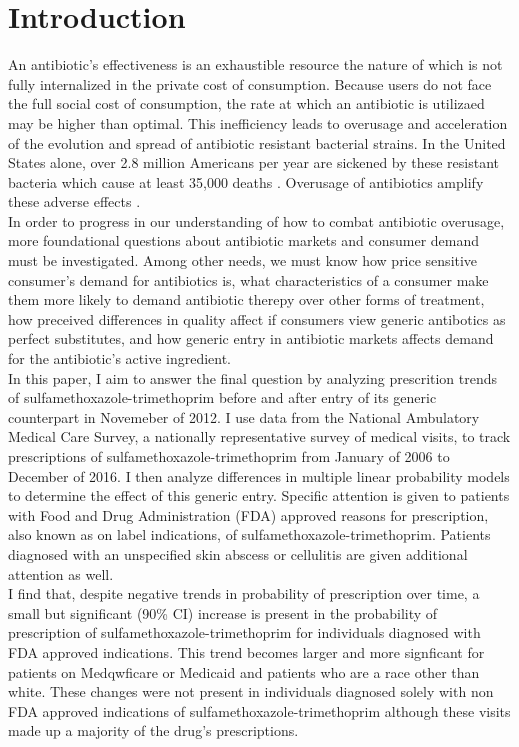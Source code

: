 \chapter{Introduction}
An antibiotic's effectiveness is an exhaustible resource the nature of which is not fully internalized in the private cost of consumption. Because users do not face the full social cost of consumption, the rate at which an antibiotic is utilizaed may be higher than optimal. This inefficiency leads to overusage and acceleration of the evolution and spread of antibiotic resistant bacterial strains. In the United States alone, over 2.8 million Americans per year are sickened by these resistant bacteria which cause at least 35,000 deaths \cite{centers_for_disease_control_and_prevention_us_antibiotic_2019}. Overusage of antibiotics amplify these adverse effects \cite{gerber_outpatient_2019}.\\
\indent In order to progress in our understanding of how to combat antibiotic overusage, more foundational questions about antibiotic markets and consumer demand must be investigated. Among other needs, we must know how price sensitive consumer's demand for antibiotics is, what characteristics of a consumer make them more likely to demand antibiotic therepy over other forms of treatment, how preceived differences in quality affect if consumers view generic antibotics as perfect substitutes, and how generic entry in antibiotic markets affects demand for the antibiotic's active ingredient.\\
\indent In this paper, I aim to answer the final question by analyzing prescrition trends of sulfamethoxazole-trimethoprim before and after entry of its generic counterpart in Novemeber of 2012. I use data from the National Ambulatory Medical Care Survey, a nationally representative survey of medical visits, to track prescriptions of sulfamethoxazole-trimethoprim from January of 2006 to December of 2016. I then analyze differences in multiple linear probability models to determine the effect of this generic entry. Specific attention is given to patients with Food and Drug Administration (FDA) approved reasons for prescription, also known as on label indications, of sulfamethoxazole-trimethoprim. Patients diagnosed with an unspecified skin abscess or cellulitis are given additional attention as well.\\
\indent I find that, despite negative trends in probability of prescription over time, a small but significant (90\% CI) increase is present in the probability of prescription of sulfamethoxazole-trimethoprim for individuals diagnosed with FDA approved indications. This trend becomes larger and more signficant for patients on Medqwficare or Medicaid and patients who are a race other than white. These changes were not present in individuals diagnosed solely with non FDA approved indications of sulfamethoxazole-trimethoprim although these visits made up a majority of the drug's prescriptions.\\
